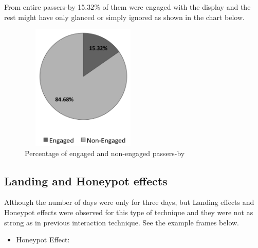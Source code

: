 From entire passers-by 15.32\% of them were engaged with the display and the rest might have only glanced or simply ignored as shown in the chart below.

\begin{figure}[H]
    \centering
    \includegraphics[width=60mm,height=60mm]{Figures/9/newbody_eng_percentage}
    \caption{Percentage of engaged and non-engaged passers-by}%
    \label{fig:newbodyengagedpasserbypercentage}%
\end{figure}


\newpage
\subsection{Landing and Honeypot effects}
Although the number of days were only for three days, but Landing effects \cite{LookingGlass} and Honeypot effects\cite{EnticingPeople} were observed for this type of technique and they were not as strong as in previous interaction technique. See the example frames below.


\begin{itemize}


\item Honeypot Effect:

\end{itemize}


